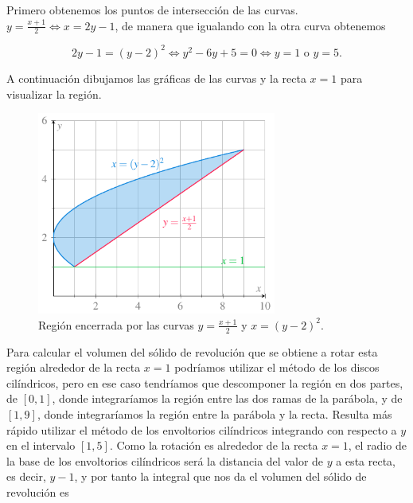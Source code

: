 \documentclass[
  a4paper,
]{scrreport}
\theoremstyle{definition}
\theoremstyle{remark}
\begin{document}
\begin{tcolorbox}[enhanced jigsaw, colframe=quarto-callout-tip-color-frame, toprule=.15mm, colback=white, bottomrule=.15mm, colbacktitle=quarto-callout-tip-color!10!white, breakable, opacityback=0, bottomtitle=1mm, toptitle=1mm, opacitybacktitle=0.6, rightrule=.15mm, arc=.35mm, titlerule=0mm, title=\textcolor{quarto-callout-tip-color}{\faLightbulb}\hspace{0.5em}{Solución}, coltitle=black, leftrule=.75mm, left=2mm]

Primero obtenemos los puntos de intersección de las curvas.
\(y=\frac{x+1}{2} \Leftrightarrow x = 2y-1\), de manera que igualando
con la otra curva obtenemos

\[
2y-1 = (y-2)^2 \Leftrightarrow y^2 - 6y + 5 = 0 \Leftrightarrow y = 1 \mbox{ o } y = 5.
\]

A continuación dibujamos las gráficas de las curvas y la recta \(x=1\)
para visualizar la región.

\begin{figure}[H]

{\centering \includegraphics[width=0.7\textwidth,height=\textheight]{img/examen-2024-04-16/region-solido-revolucion-int-10-gen.pdf}

}

\caption{Región encerrada por las curvas \(y=\frac{x+1}{2}\) y
\(x=(y-2)^2\).}

\end{figure}%

Para calcular el volumen del sólido de revolución que se obtiene a rotar
esta región alrededor de la recta \(x=1\) podríamos utilizar el método
de los discos cilíndricos, pero en ese caso tendríamos que descomponer
la región en dos partes, de \([0, 1]\), donde integraríamos la región
entre las dos ramas de la parábola, y de \([1, 9]\), donde integraríamos
la región entre la parábola y la recta. Resulta más rápido utilizar el
método de los envoltorios cilíndricos integrando con respecto a \(y\) en
el intervalo \([1, 5]\). Como la rotación es alrededor de la recta
\(x=1\), el radio de la base de los envoltorios cilíndricos será la
distancia del valor de \(y\) a esta recta, es decir, \(y-1\), y por
tanto la integral que nos da el volumen del sólido de revolución es


\end{tcolorbox}
\end{document}

